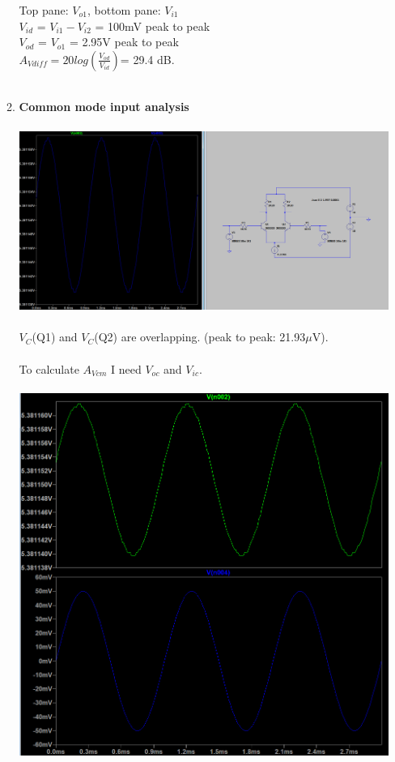 \documentclass{article}
\begin{document}
\begin{enumerate}
\begin{enumerate}
			Top pane: \(V_{o1}\), bottom pane: \(V_{i1}\)\\
			\(V_{id}\) = \(V_{i1} - V_{i2}\) = 100mV peak to peak\\
			\(V_{od}\) = \(V_{o1}\) = 2.95V peak to peak\\
			\(A_{Vdiff} = 20log(\frac{V_{od}}{V_{id}}) \)= 29.4 dB.\\\\
			\pagebreak
			\item \textbf{Common mode input analysis}\\\\
			\includegraphics[scale=0.4]{prelab 4/circuit 7 - coll voltages}\\\\
			\(V_C\)(Q1) and \(V_C\)(Q2) are overlapping. (peak to peak: 21.93\(\mu\)V).\\\\
			To calculate \(A_{Vcm}\) I need \(V_{oc}\) and \(V_{ic}\).\\\\
			\includegraphics[scale=0.6]{prelab 4/circuit 7 - avcm}\\\\

\end{enumerate}
\end{enumerate}
\end{document}
